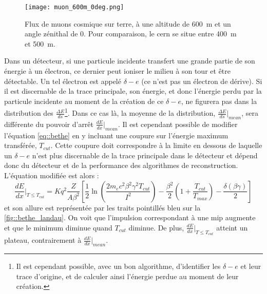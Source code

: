         \begin{figure}[htbp]
          \centering
          \texttt{[image: muon\_600m\_0deg.png]}
          \caption[Flux de muons cosmique sur terre.]{\label{fig::muon_flux}Flux de muons cosmique sur terre, à une altitude de \SI{600}{\meter} et un angle zénithal de 0\cite{Shukla2016}. Pour comparaison, le \gls{cern} se situe entre \SI{400}{\meter} et \SI{500}{\meter}.}
        \end{figure}
        
        Dans un détecteur, si une particule incidente transfert une grande partie de son énergie à un électron, ce dernier peut ioniser le milieu à son tour et être détectable. Un tel électron est appelé $\delta-e$ (ce n'est pas un électron de dérive). Si il est discernable de la trace principale, son énergie, et donc l'énergie perdu par la particule incidente au moment de la création de ce $\delta-e$, ne figurera pas dans la distribution des $\frac{\Delta E}{ds}$\footnote{Il est cependant possible, avec un bon algorithme, d'identifier les $\delta-e$ et leur trace d'origine, et de calculer ainsi l'énergie perdue au moment de leur création.}. Dans ce cas là, la moyenne de la distribution, $\frac{\Delta E}{ds}\rvert_{mean}$, sera différente du pouvoir d'arrêt $\frac{dE}{dx}\rvert_{mean}$. Il est cependant possible de modifier l'équation \eqref{eq::bethe} en y incluant une coupure sur l'énergie maximum transférée, $T_{cut}$\cite{pdg2018}. Cette coupure doit correspondre à la limite en dessous de laquelle un $\delta-e$ n'est plus discernable de la trace principale dans le détecteur et dépend donc du détecteur et de la performance des algorithmes de reconstruction. L'équation modifiée est alors :
        \begin{equation}\label{eq::bethe_tcut}
          \frac{dE}{dx}\biggr\rvert_{T\leq T_{cut}} = Kq^2 \frac{Z}{A\beta^2}\left[\frac{1}{2}\ln\left(\frac{2m_ec^2\beta^2\gamma^2T_{cut}}{I^2}\right)-\frac{\beta^2}{2}\left(1+\frac{T_{cut}}{T_{max}}\right)-\frac{\delta(\beta\gamma)}{2} \right]
        \end{equation}
        et son allure est représentée par les traits pointillés bleu sur la \autoref{fig::bethe_landau}. On voit que l'impulsion correspondant à une \gls{mip} augmente  et que le minimum diminue quand $T_{cut}$ diminue. De plus, $\frac{dE}{dx}\rvert_{T\leq T_{cut}}$ atteint un plateau, contrairement à $\frac{dE}{dx}\rvert_{mean}$.
        
